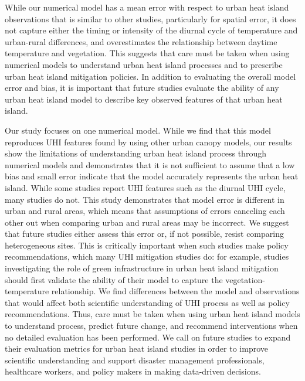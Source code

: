 \documentclass[draft,linenumbers]{agujournal}
\begin{document}
While our numerical model has a mean error with respect to urban heat island observations that is similar to other studies, particularly for spatial error, it does not capture either the timing or intensity of the diurnal cycle of temperature and urban-rural differences, and overestimates the relationship between daytime temperature and vegetation. This suggests that care must be taken when using numerical models to understand urban heat island processes and to prescribe urban heat island mitigation policies. 
In addition to evaluating the overall model error and bias, it is important that future studies evaluate the ability of any urban heat island model to describe key observed features of that urban heat island. 

Our study focuses on one numerical model. While we find that this model reproduces UHI features found by using other urban canopy models, our results show the limitations of understanding urban heat island process through numerical models and demonstrates that it is not sufficient to assume that a low bias and small error indicate that the model accurately represents the urban heat island.  
While some studies report UHI features such as the diurnal UHI cycle, many studies do not. 
This study demonstrates that model error is different in urban and rural areas, which means that assumptions of errors canceling each other out when comparing urban and rural areas may be incorrect. 
We suggest that future studies either assess this error or, if not possible, resist comparing heterogeneous sites. This is critically important when such studies make policy recommendations, which many UHI mitigation studies do: for example, studies investigating the role of green infrastructure in urban heat island mitigation should first validate the ability of their model to capture the vegetation-temperature relationship. 
We find differences between the model and observations that would affect both scientific understanding of UHI process as well as policy recommendations. 
Thus, care must be taken when using urban heat island models to understand process, predict future change, and recommend interventions when no detailed evaluation has been performed. We call on future studies to expand their evaluation metrics for urban heat island studies in order to improve scientific understanding and support disaster management professionals, healthcare workers, and policy makers in making data-driven decisions. 
\end{document}
